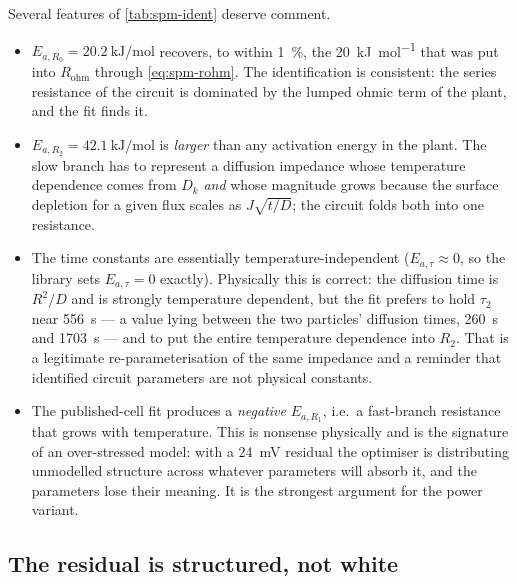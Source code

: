 Several features of \cref{tab:spm-ident} deserve comment.
\begin{itemize}[nosep,leftmargin=*]
\item $E_{a,R_0} = \SI{20.2}{\kilo\joule\per\mole}$ recovers, to within \SI{1}{\percent}, the
  \SI{20}{\kilo\joule\per\mole} that was put into $R_{\mathrm{ohm}}$ through
  \eqref{eq:spm-rohm}. The identification is consistent: the series resistance of the circuit is
  dominated by the lumped ohmic term of the plant, and the fit finds it.
\item $E_{a,R_2} = \SI{42.1}{\kilo\joule\per\mole}$ is \emph{larger} than any activation energy
  in the plant. The slow branch has to represent a diffusion impedance whose temperature
  dependence comes from $D_k$ \emph{and} whose magnitude grows because the surface depletion for
  a given flux scales as $J\sqrt{t/D}$; the circuit folds both into one resistance.
\item The time constants are essentially temperature-independent
  ($E_{a,\tau}\approx 0$, so the library sets $E_{a,\tau}=0$ exactly). Physically this is
  correct: the diffusion time is $R^2/D$ and is strongly temperature dependent, but the fit
  prefers to hold $\tau_2$ near \SI{556}{\second} --- a value lying between the two particles'
  diffusion times, \SI{260}{\second} and \SI{1703}{\second} --- and to put the entire
  temperature dependence into $R_2$. That is a legitimate re-parameterisation of the same
  impedance and a reminder that identified circuit parameters are not physical constants.
\item The published-cell fit produces a \emph{negative} $E_{a,R_1}$, i.e.\ a fast-branch
  resistance that grows with temperature. This is nonsense physically and is the signature of an
  over-stressed model: with a \SI{24}{\milli\volt} residual the optimiser is distributing
  unmodelled structure across whatever parameters will absorb it, and the parameters lose their
  meaning. It is the strongest argument for the power variant.
\end{itemize}

\subsection{The residual is structured, not white}
\label{sec:spm-residual}

